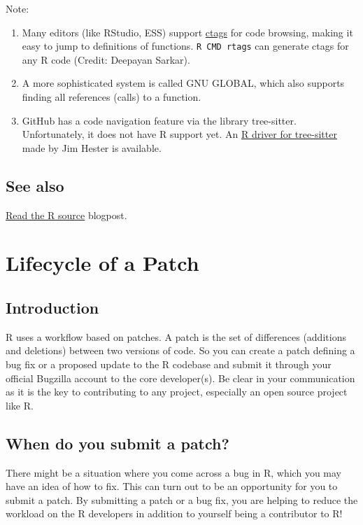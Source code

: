 \documentclass[
]{book}
\begin{document}
Note:

\begin{enumerate}
\def\labelenumi{\arabic{enumi}.}
\item
  Many editors (like RStudio, ESS) support \href{https://en.wikipedia.org/wiki/Ctags}{ctags} for code browsing, making it easy to jump to definitions of functions. \texttt{R\ CMD\ rtags} can generate ctags for any R code (Credit: Deepayan Sarkar).
\item
  A more sophisticated system is called GNU GLOBAL, which also supports
  finding all references (calls) to a function.
\item
  GitHub has a code navigation feature via the library tree-sitter. Unfortunately, it does not have R support yet. An \href{https://github.com/r-lib/tree-sitter-r}{R driver for tree-sitter} made by Jim Hester is available.
\end{enumerate}

\section{See also}\label{see-also-3}

\href{https://blog.r-hub.io/2019/05/14/read-the-source/}{Read the R source} blogpost.

\chapter{Lifecycle of a Patch}\label{FixBug}

\section{Introduction}\label{introduction-1}

R uses a workflow based on patches. A patch is the set of differences (additions and deletions) between two versions of code. So you can create a patch defining a bug fix or a proposed update to the R codebase and submit it through your official Bugzilla account to the core developer(s). Be clear in your communication as it is the key to contributing to any project, especially an open source project like R.

\section{When do you submit a patch?}\label{when-do-you-submit-a-patch}

There might be a situation where you come across a bug in R, which you may have an idea of how to fix. This can turn out to be an opportunity for you to submit a patch. By submitting a patch or a bug fix, you are helping to reduce the workload on the R developers in addition to yourself being a contributor to R!
\end{document}
